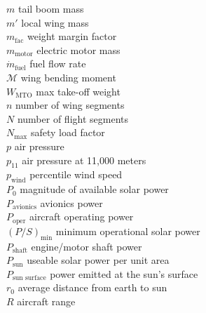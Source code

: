 \begin{multicols}{2}
\begin{tabbing}
$m$ \> tail boom mass \\ %
$m'$ \> local wing mass \\ %
$m_{\text{fac}}$ \> weight margin factor \\
$m_{\text{motor}}$ \> electric motor mass \\
$\dot{m}_{\text{fuel}}$ \> fuel flow rate \\ %
$\mathcal{M}$ \> wing bending moment \\ %
$W_{\text{MTO}}$\> max take-off weight \\ %
$n$ \> number of wing segments \\
$N$ \> number of flight segments \\
$N_{\text{max}}$ \> safety load factor\\
$p$ \> air pressure \\ %
$p_{11}$ \> air pressure at 11,000 meters \\ %
$p_{\text{wind}}$ \> percentile wind speed \\
$P_{0}$ \> magnitude of available solar power \\ %
$P_{\text{avionics}}$ \> avionics power \\ %
$P_{\text{oper}}$ \> aircraft operating power \\ %
$(P/S)_{\text{min}}$ \> minimum operational solar power \\ %
$P_{\text{shaft}}$ \> engine/motor shaft power \\ %
$P_{\text{sun}}$ \> useable solar power per unit area \\ %
$P_{\text{sun surface}}$ \> power emitted at the sun's surface \\ %
$r_0$ \> average distance from earth to sun \\
$R$ \> aircraft range \\ %

\end{tabbing}
\end{multicols}
